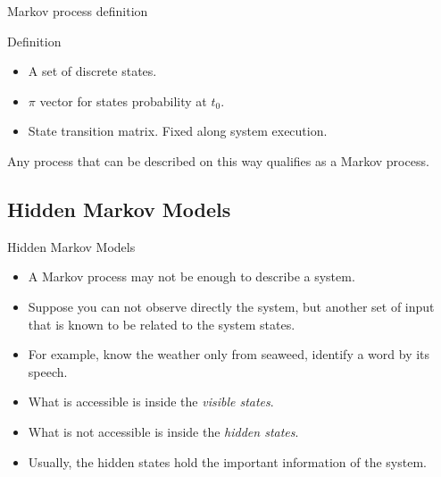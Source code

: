 \documentclass[xcolor=x11names,compress]{beamer}
\renewcommand{\(}{\begin{columns}}
\renewcommand{\)}{\end{columns}}
\newcommand{\<}[1]{\begin{column}{#1}}
\renewcommand{\>}{\end{column}}
\begin{document}
\begin{frame}{Markov process definition}
\begin{block}{Definition}
\begin{itemize}
\item A set of discrete states.
\item $\pi$ vector for states probability at $t_0$.
\item State transition matrix. Fixed along system execution.
\end{itemize}
Any process that can be described on this way qualifies as a Markov process.
\end{block}
\end{frame}

\subsection{Hidden Markov Models}
\begin{frame}{Hidden Markov Models}
\begin{itemize}
	\item A Markov process may not be enough to describe a system.
	\item Suppose you can not observe directly the system, but another set of input that is known to be related to the system states.
	\item For example, know the weather only from seaweed, identify a word by its speech.
	\item What is accessible is inside the \emph{visible states}.
	\item What is not accessible is inside the \emph{hidden states}.
	\item Usually, the hidden states hold the important information of the system.
\end{itemize}
\end{frame}
\end{document}
